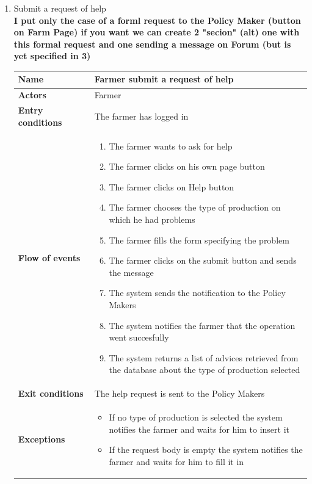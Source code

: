 \begin{enumerate}
    \item Submit a request of help\\
    \textbf{I put only the case of a forml request to the Policy Maker (button on Farm Page) if you want we can create 2 "secion" (alt) one with this formal request and one sending a message on Forum (but is yet specified in 3)}
    \begin{longtable}{p{0.26\linewidth}p{0.75\linewidth}}
        \toprule
        \textbf{Name} & \textbf{Farmer submit a request of help} \\
        \midrule
        \textbf{Actors} & Farmer \\
        \midrule
        \textbf{Entry conditions} & The farmer has logged in\\
        \midrule
        \textbf{Flow of events} & 
        \begin{enumerate}
            \item The farmer wants to ask for help
            \item The farmer clicks on his own page button
            \item The farmer clicks on Help button
            \item The farmer chooses the type of production on which he had problems
            \item The farmer fills the form specifying the problem
            \item The farmer clicks on the submit button and sends the message
            \item The system sends the notification to the Policy Makers
            \item The system notifies the farmer that the operation went succesfully
            \item The system returns a list of advices retrieved from the database about the type of production selected
        \end{enumerate} \\
        \midrule
        \textbf{Exit conditions} & The help request is sent to the Policy Makers\\
        \midrule
        \textbf{Exceptions} & 
        \begin{itemize}
            \item If no type of production is selected the system notifies the farmer and waits for him to insert it
            \item If the request body is empty the system notifies the farmer and waits for him to fill it in
        \end{itemize}\\

\end{longtable}
\end{enumerate}

